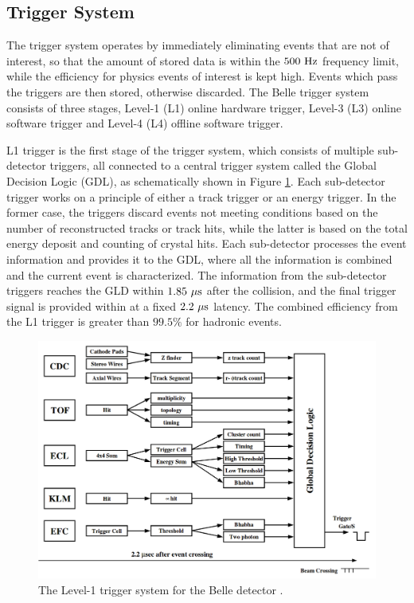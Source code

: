 \subsection{Trigger System}
The trigger system operates by immediately eliminating events that are not of interest, so that the amount of stored data is within the $500\mathrm{~Hz}$ frequency limit, while the efficiency for physics events of interest is kept high. Events which pass the triggers are then stored, otherwise discarded. The Belle trigger system consists of three stages, Level-1 (L1) online hardware trigger, Level-3 (L3) online software trigger and Level-4 (L4) offline software trigger.

L1 trigger is the first stage of the trigger system, which consists of multiple sub-detector triggers, all connected to a central trigger system called the Global Decision Logic (GDL), as schematically shown in Figure \ref{fig:TRG_GDL}. Each sub-detector trigger works on a principle of either a track trigger or an energy trigger. In the former case, the triggers discard events not meeting conditions based on the number of reconstructed tracks or track hits, while the latter is based on the total energy deposit and counting of crystal hits. Each sub-detector processes the event information and provides it to the GDL, where all the information is combined and the current event is characterized. The information from the sub-detector triggers reaches the GLD within $1.85\mathrm{~\mu s}$ after the collision, and the final trigger signal is provided within at a fixed $2.2\mathrm{~\mu s}$ latency. The combined efficiency from the L1 trigger is greater than $99.5\%$ for hadronic events.

\begin{figure}[!htb]
	\centering
	\captionsetup{width=0.8\linewidth}
	\includegraphics[width=0.8\linewidth]{fig/setup/TRG_GDL}
	\caption{The Level-1 trigger system for the Belle detector \cite{ABASHIAN2002117}.}
	\label{fig:TRG_GDL}
\end{figure}

